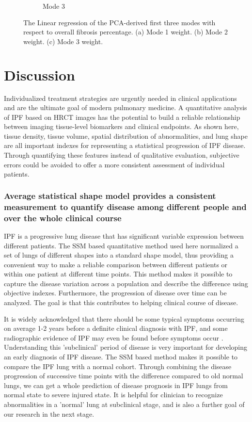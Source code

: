 \begin{figure}[H]
\begin{subfigure}{.65\linewidth}
  \caption{Mode 3}
  \label{fig:ShapeVSFibrosis-c}
\end{subfigure}
\caption{ The Linear regression of the PCA-derived first three modes with respect to overall fibrosis percentage. (a) Mode 1 weight. (b) Mode 2 weight. (c) Mode 3  weight.}
\label{fig:ShapeVSFibrosis}
\end{figure}

\section{Discussion} \label{QuantitativeDiscussion}
Individualized treatment strategies are urgently needed in clinical applications and are the ultimate goal of modern pulmonary medicine. A quantitative analysis of IPF based on HRCT images has the potential to build a reliable relationship between imaging tissue-level biomarkers and clinical endpoints. As shown here, tissue density, tissue volume, spatial distribution of abnormalities, and lung shape are all important indexes for representing a statistical progression of IPF disease. Through quantifying these features instead of qualitative evaluation, subjective errors could be avoided to offer a more consistent assessment of individual patients.  

\subsubsection{Average statistical shape model provides a consistent measurement to quantify disease among different people and over the whole clinical course}
IPF is a progressive lung disease that has significant variable expression between different patients. The SSM based quantitative method used here normalized a set of lungs of different shapes into a standard shape model, thus providing a convenient way to make a reliable comparison between different patients or within one patient at different time points. This method makes it possible to capture the disease variation across a population and describe the difference using objective indexes. Furthermore, the progression of disease over time can be analyzed. The goal is that this contributes to helping clinical course of disease. 

It is widely acknowledged that there should be some typical symptoms occurring on average 1-2 years before a definite clinical diagnosis with IPF, and some radiographic evidence of IPF may even be found before symptoms occur \citep{raghu2011official, devaraj2014imaging}. Understanding this 'subclinical' period of disease is very important for developing an early diagnosis of IPF disease. The SSM based method makes it possible to compare the IPF lung with a normal cohort. Through combining the disease progression of successive time points with the difference compared to old normal lungs, we can get a whole prediction of disease prognosis in IPF lungs from normal state to severe injured state. It is helpful for clinician to recognize abnormalities in a 'normal' lung at subclinical stage, and is also a further goal of our research in the next stage. 

